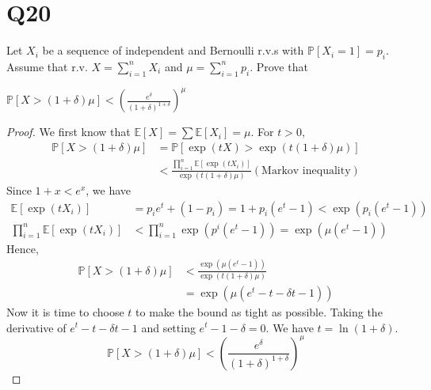 \documentclass[11pt]{article}
\begin{document}
\section*{Q20}
Let $X_{i}$ be a sequence of independent and Bernoulli r.v.s with 
$\mathbb{P}\left[ X_{i}=1 \right]=p_{i} $. Assume that r.v. 
$X=\sum_{i=1}^{n}X_{i}$ and $\mu = \sum_{i=1}^{n}p_{i}$. Prove 
that 
\begin{qparts}
    
    \item $\mathbb{P}\left[ X>(1+\delta)\mu \right]<
    \left( \frac{e^{\delta}}{(1+\delta)^{1+\delta}} \right)^{\mu} $
    \begin{proof}
        We first know that $\mathbb{E}\left[ X \right]=\sum\mathbb{E}\left[ X_{i} \right] =\mu $. For $t>0$,
        \begin{align*}
            \mathbb{P}\left[ X>(1+\delta)\mu \right] &= 
            \mathbb{P}\left[  \exp (tX) > \exp(t(1+\delta)\mu)\right]\\
            &<\frac{\prod_{i=1}^{n}\mathbb{E}\left[ \exp(tX_{i}) \right]  }{\exp(t(1+\delta)\mu)} (\text{Markov inequality})
        \end{align*}
        Since $1+x<e^{x}$, we have
        \begin{align*}
            \mathbb{E}\left[ \exp(tX_{i}) \right]&=p_{i}e^{t}+(1-p_{i})
        =1+p_{i}(e^{t}-1)<\exp(p_{i}(e^{t}-1))\\
        \prod_{i=1}^{n } \mathbb{E}\left[ \exp(tX_{i}) \right]&<
        \prod_{i=1}^{n }\exp(p^{i}(e^{t}-1))=\exp(\mu(e^{t}-1))
        \end{align*}
        Hence,
        \begin{align*}
            \mathbb{P}\left[ X>(1+\delta)\mu \right] &<
            \frac{\exp(\mu(e^{t}-1))}{\exp(t(1+\delta)\mu)}\\
            &=\exp(\mu(e^{t}-t-\delta t-1))
        \end{align*}
        Now it is time to choose $t$ to make the bound as tight as 
        possible. Taking the derivative of $e^{t}-t-\delta t-1$ and setting $e^{t}-1-\delta=0$. We have $t=\ln(1+\delta)$.
        $$
        \mathbb{P}\left[ X>(1+\delta)\mu \right]<
    \left( \frac{e^{\delta}}{(1+\delta)^{1+\delta}} \right)^{\mu} 
        $$

    \end{proof}


\end{qparts}
\end{document}
